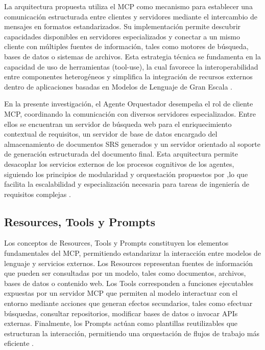 La arquitectura propuesta utiliza el MCP como mecanismo para establecer una comunicación estructurada entre clientes y 
servidores mediante el intercambio de mensajes en formatos estandarizados. Su implementación permite descubrir capacidades disponibles en servidores 
especializados y conectar a un mismo cliente con múltiples fuentes de información, tales como motores de búsqueda, bases de datos o sistemas de archivos. 
Esta estrategia técnica se fundamenta en la capacidad de uso de herramientas (tool-use), la cual favorece la interoperabilidad entre componentes 
heterogéneos y simplifica la integración de recursos externos dentro de aplicaciones basadas en Modelos de Lenguaje de Gran Escala \cite{Guo2024}.

En la presente investigación, el Agente Orquestador desempeña el rol de cliente MCP, coordinando la comunicación con diversos servidores especializados. 
Entre ellos se encuentran un servidor de búsqueda web para el enriquecimiento contextual de requisitos, un servidor de base de datos encargado del 
almacenamiento de documentos SRS generados y un servidor orientado al soporte de generación estructurada del documento final. Esta arquitectura 
permite desacoplar los servicios externos de los procesos cognitivos de los agentes, siguiendo los principios de modularidad y orquestación 
propuestos por \cite{Guo2024},lo que facilita la escalabilidad y especialización necesaria para tareas de ingeniería de requisitos complejas \cite{xi2025rise}.

\subsection{Resources, Tools y Prompts}

Los conceptos de Resources, Tools y Prompts constituyen los elementos fundamentales del MCP, permitiendo estandarizar la 
interacción entre modelos de lenguaje y servicios externos. Los Resources representan fuentes de información que pueden ser consultadas por un modelo,
tales como documentos, archivos, bases de datos o contenido web. Los Tools corresponden a funciones ejecutables expuestas por un servidor MCP que 
permiten al modelo interactuar con el entorno mediante acciones que generan efectos secundarios, tales como efectuar búsquedas, consultar repositorios, 
modificar bases de datos o invocar APIs externas. Finalmente, los Prompts actúan como plantillas reutilizables que estructuran la interacción, 
permitiendo una orquestación de flujos de trabajo más eficiente \cite{hou2025model}.

